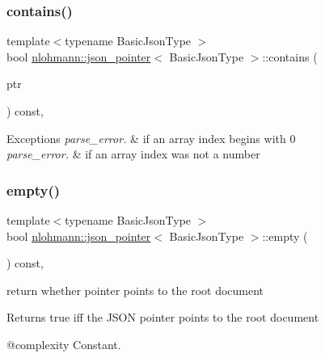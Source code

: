 \subsubsection{\texorpdfstring{contains()}{contains()}}
{\footnotesize\ttfamily template$<$typename Basic\+Json\+Type $>$ \\
bool \mbox{\hyperlink{classnlohmann_1_1json__pointer}{nlohmann\+::json\+\_\+pointer}}$<$ Basic\+Json\+Type $>$\+::contains (\begin{DoxyParamCaption}\item[{const Basic\+Json\+Type $\ast$}]{ptr }\end{DoxyParamCaption}) const\hspace{0.3cm}{\ttfamily [inline]}, {\ttfamily [private]}}


\begin{DoxyExceptions}{Exceptions}
{\em parse\+\_\+error.} & if an array index begins with \textquotesingle{}0\textquotesingle{} \\
\hline
{\em parse\+\_\+error.} & if an array index was not a number \\
\hline
\end{DoxyExceptions}
\mbox{\label{classnlohmann_1_1json__pointer_a649252bda4a2e75a0915b11a25d8bcc3}} 
\subsubsection{\texorpdfstring{empty()}{empty()}}
{\footnotesize\ttfamily template$<$typename Basic\+Json\+Type $>$ \\
bool \mbox{\hyperlink{classnlohmann_1_1json__pointer}{nlohmann\+::json\+\_\+pointer}}$<$ Basic\+Json\+Type $>$\+::empty (\begin{DoxyParamCaption}{ }\end{DoxyParamCaption}) const\hspace{0.3cm}{\ttfamily [inline]}, {\ttfamily [noexcept]}}



return whether pointer points to the root document 

\begin{DoxyReturn}{Returns}
true iff the J\+S\+ON pointer points to the root document
\end{DoxyReturn}
@complexity Constant.

